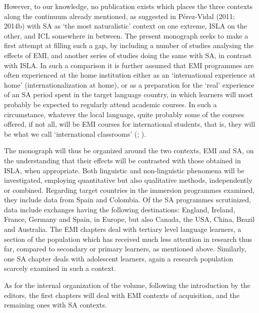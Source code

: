However, to our knowledge, no publication exists which places the three contexts along the continuum already mentioned, as suggested in Pérez-Vidal (2011; 2014b) with SA as ‘the most naturalistic’ context on one extreme, ISLA on the other, and ICL somewhere in between. The present monograph seeks to make a first attempt at filling such a gap, by including a number of studies analysing the effects of EMI, and another series of studies doing the same with SA, in contrast with ISLA. In such a comparison it is further assumed that EMI programmes are often experienced at the home institution either as an ‘international experience at home’ (internationalization at home), or as a preparation for the ‘real’ experience of an SA period spent in the target language country, in which learners will most probably be expected to regularly attend academic courses. In such a circumstance, whatever the local language, quite probably some of the courses offered, if not all, will be EMI courses for international students, that is, they will be what we call ‘international classrooms’ (\citealt{Coleman2013}; \citealt{Leask2015}). 

The monograph will thus be organized around the two contexts, EMI and SA, on the understanding that their effects will be contrasted with those obtained in ISLA, when appropriate. Both linguistic and non-linguistic phenomena will be investigated, employing quantitative but also qualitative methods, independently or combined. Regarding target countries in the immersion programmes examined, they include data from Spain and Colombia. Of the SA programmes scrutinized, data include exchanges having the following destinations: England, Ireland, France, Germany and Spain, in Europe, but also Canada, the USA, China, Brazil and Australia. The EMI chapters deal with tertiary level language learners, a section of the population which has received much less attention in research thus far, compared to secondary or primary learners, as mentioned above. Similarly, one SA chapter deals with adolescent learners, again a research population scarcely examined in such a context.

As for the internal organization of the volume, following the introduction by the editors, the first chapters will deal with EMI contexts of acquisition, and the remaining ones with SA contexts. 

